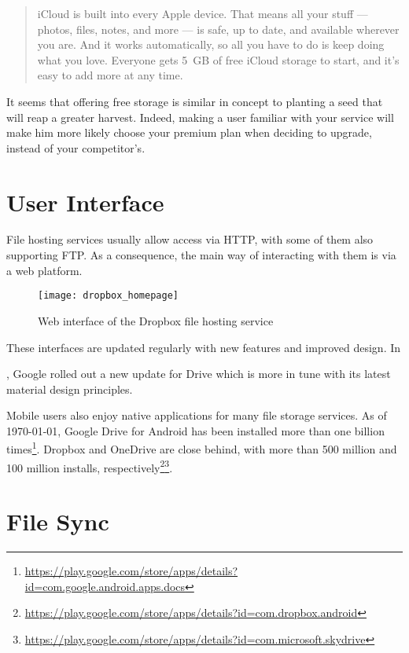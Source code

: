\begin{quote}
iCloud is built into every Apple device. That means all your stuff — photos, files, notes, and more — is safe, up to date, and available wherever you are. And it works automatically, so all you have to do is keep doing what you love. Everyone gets \mbox{5 GB} of free iCloud storage to start, and it’s easy to add more at any time.
\end{quote}

It seems that offering free storage is similar in concept to planting a seed that will reap a greater harvest. Indeed, making a user familiar with your service will make him more likely choose your premium plan when deciding to upgrade, instead of your competitor's.

\section{User Interface}

File hosting services usually allow access via \mbox{HTTP}, with some of them also supporting \mbox{FTP}. As a consequence, the main way of interacting with them is via a web platform.

\begin{figure}[tbp]
\caption{Web interface of the Dropbox file hosting service}
\centering
\texttt{[image: dropbox\_homepage]}
\end{figure}

These interfaces are updated regularly with new features and improved design. In \date{May 2018}, Google rolled out a new update\cite{google_drive_ui_updates} for Drive which is more in tune with its latest material design principles\cite{how_google_created_a_custom_material_theme}.

Mobile users also enjoy native applications for many file storage services. As of \monthyeardate\today, Google Drive for Android has been installed more than one billion times\footnote{\url{https://play.google.com/store/apps/details?id=com.google.android.apps.docs}}. Dropbox and OneDrive are close behind, with more than 500 million and 100 million installs, respectively\footnote{\url{https://play.google.com/store/apps/details?id=com.dropbox.android}}\footnote{\url{https://play.google.com/store/apps/details?id=com.microsoft.skydrive}}.

\section{File Sync}

